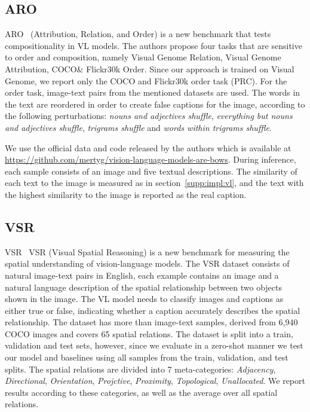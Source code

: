 \documentclass[11pt]{article}
\def\secref#1{section~\ref{#1}}
\newcommand{\minisection}[1]{\noindent{\textbf{#1}.}}
\begin{document}
\subsection{ARO}
\label{supp:impl:aro}
\minisection{Dataset} ARO~\cite{yuksekgonul2023when} (Attribution, Relation, and Order) is a new benchmark that tests compositionality in VL models.
The authors propose four tasks that are sensitive to order and composition, namely Visual Genome Relation, Visual Genome Attribution, COCO\& Flickr30k Order. Since our approach is trained on Visual Genome, we report only the COCO and Flickr30k order task (PRC). For the order task, image-text pairs from the mentioned datasets are used. The words in the text are reordered in order to create false captions for the image, according to the following perturbations: \emph{nouns and adjectives shuffle}, \emph{everything but nouns and adjectives shuffle},  \emph{trigrams shuffle} and \emph{words within trigrams shuffle}.


\minisection{Inference details} We use the official data and code released by the authors which is available at \url{https://github.com/mertyg/vision-language-models-are-bows}. 
During inference, each sample consists of an image and five textual descriptions. The similarity of each text to the image is measured as in \secref{supp:impl:vl}, and the text with the highest similarity to the image is reported as the real caption.



\subsection{VSR}
\label{supp:impl:vsr}
\minisection{Dataset} VSR~\cite{Liu2022VisualSR} VSR (Visual Spatial Reasoning) is a new benchmark for measuring the spatial understanding of vision-language models. The VSR dataset consists of natural image-text pairs in English, each example contains an image and a natural language description of the spatial relationship between two objects shown in the image. The VL model needs to classify images and captions as either true or false, indicating whether a caption accurately describes the spatial relationship. The dataset has more than  image-text samples,  derived from 6,940 COCO images and covers 65 spatial relations. The dataset is split into a train, validation and test sets, however, since we evaluate in a zero-shot manner we test our model and baselines using all samples from the train, validation, and test splits. The spatial relations are divided into 7 meta-categories: \emph{Adjacency}, \emph{Directional}, \emph{Orientation}, \emph{Projctive}, \emph{Proximity}, \emph{Topological}, \emph{Unallocated}. We report results according to these categories, as well as the average over all spatial relations. 
\end{document}
